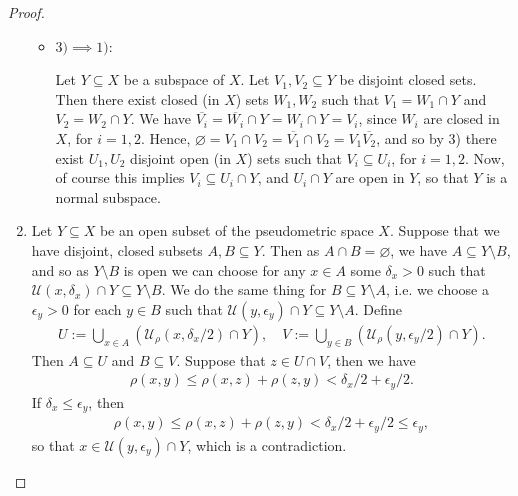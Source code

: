 \documentclass[12pt]{extarticle}
\newcommand{\<}{\langle}
\renewcommand{\>}{\rangle}
\renewcommand{\emptyset}{\varnothing}
\theoremstyle{definition}
\begin{document}
\begin{proof}
\begin{enumerate}
\begin{itemize}
    \item $3) \implies 1)$:
      
      Let $Y \subseteq X$ be a subspace of $X$. Let $V_1, V_2 \subseteq Y$ be disjoint closed sets. Then there exist closed (in $X$) sets $W_1, W_2$ such that
      $V_1 = W_1 \cap Y$ and $V_2 = W_2 \cap Y$. We have $\overline{V_i} = \overline{W_i} \cap Y = W_i \cap Y = V_i $, since $W_i$ are closed in $X$, for $i=1,2$.
      Hence, $\emptyset = V_1 \cap V_2 = \overline{V_1} \cap V_2 = V_1 \overline{V_2}$, and so by 3) there exist $U_1, U_2$ disjoint open (in $X$) sets such that
      $V_i \subseteq U_i$, for $i=1,2$. Now, of course this implies $V_i \subseteq U_i \cap Y$, and $U_i \cap Y$ are open in $Y$, so that $Y$ is a normal subspace. 
    \end{itemize}
  \item
    Let $Y \subseteq X$ be an open subset of the pseudometric space $X$. Suppose that we have disjoint, closed subsets $A,B \subseteq Y$.
    Then as $A \cap B = \emptyset$, we have $A \subseteq Y \setminus B$, and so as $Y \setminus B$ is open we can choose for any $x \in A$ some $\delta_x>0$ such that $\mathcal{U}(x, \delta_x) \cap Y \subseteq Y \setminus B$.
    We do the same thing for $B \subseteq Y \setminus A$, i.e. we choose a $\epsilon_y >0$ for each $y \in B$ such that $\mathcal{U}(y, \epsilon_y) \cap Y \subseteq Y \setminus A$. Define
    \begin{align*}
      U := \bigcup\limits_{x \in A} (\mathcal{U}_{\rho}(x, \delta_x/2) \cap Y), \quad V := \bigcup\limits_{y \in B} (\mathcal{U}_{\rho}(y, \epsilon_y/2) \cap Y).
    \end{align*}
    Then $A \subseteq U$ and $B \subseteq V$. Suppose that $z \in U \cap V$, then we have
    \begin{align*}
      \rho(x,y) \leq \rho(x,z) + \rho(z,y) < \delta_x/2 + \epsilon_y/2.
    \end{align*}
    If $\delta_x \leq \epsilon_y$, then 
    \begin{align*}
      \rho(x,y) \leq \rho(x,z) + \rho(z,y) < \delta_x/2 + \epsilon_y/2 \leq \epsilon_y,
    \end{align*}
    so that $x \in \mathcal{U}(y, \epsilon_y) \cap Y$, which is a contradiction.


\end{enumerate}
\end{proof}
\end{document}
